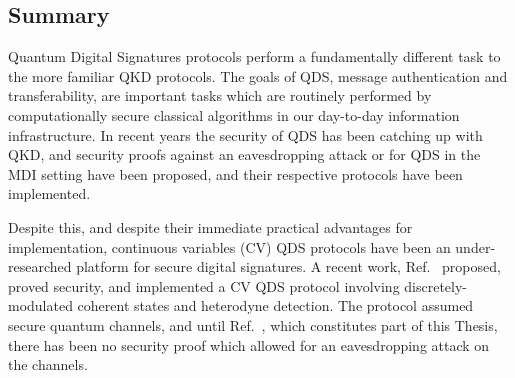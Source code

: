 \subsection{Summary}
Quantum Digital Signatures protocols perform a fundamentally different task to the more familiar QKD protocols. The goals of QDS, message authentication and transferability, are important tasks which are routinely performed by computationally secure classical algorithms in our day-to-day information infrastructure. In recent years the security of QDS has been catching up with QKD, and security proofs against an eavesdropping attack \cite{Amiri2016, Yin2016} or for QDS in the MDI setting \cite{Puthoor2016} have been proposed, and their respective protocols have been implemented. 

Despite this, and despite their immediate practical advantages for implementation, continuous variables (CV) QDS protocols have been an under-researched platform for secure digital signatures.  A recent work, Ref.~\cite{Croal2016} proposed, proved security, and implemented a CV QDS protocol involving discretely-modulated coherent states and heterodyne detection. The protocol assumed secure quantum channels, and until Ref.~\cite{Thornton2019}, which constitutes part of this Thesis, there has been no security proof which allowed for an eavesdropping attack on the channels.


